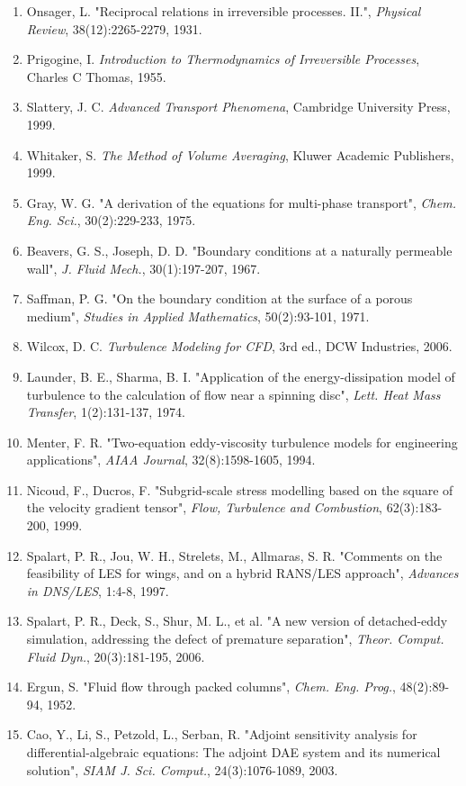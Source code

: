 \documentclass[11pt,a4paper]{article}
\begin{document}
\begin{enumerate}[leftmargin=*]
    \item Onsager, L. "Reciprocal relations in irreversible processes. II.", \textit{Physical Review}, 38(12):2265-2279, 1931.
    \item Prigogine, I. \textit{Introduction to Thermodynamics of Irreversible Processes}, Charles C Thomas, 1955.
    \item Slattery, J. C. \textit{Advanced Transport Phenomena}, Cambridge University Press, 1999.
    \item Whitaker, S. \textit{The Method of Volume Averaging}, Kluwer Academic Publishers, 1999.
    \item Gray, W. G. "A derivation of the equations for multi-phase transport", \textit{Chem. Eng. Sci.}, 30(2):229-233, 1975.
    \item Beavers, G. S., Joseph, D. D. "Boundary conditions at a naturally permeable wall", \textit{J. Fluid Mech.}, 30(1):197-207, 1967.
    \item Saffman, P. G. "On the boundary condition at the surface of a porous medium", \textit{Studies in Applied Mathematics}, 50(2):93-101, 1971.
    \item Wilcox, D. C. \textit{Turbulence Modeling for CFD}, 3rd ed., DCW Industries, 2006.
    \item Launder, B. E., Sharma, B. I. "Application of the energy-dissipation model of turbulence to the calculation of flow near a spinning disc", \textit{Lett. Heat Mass Transfer}, 1(2):131-137, 1974.
    \item Menter, F. R. "Two-equation eddy-viscosity turbulence models for engineering applications", \textit{AIAA Journal}, 32(8):1598-1605, 1994.
    \item Nicoud, F., Ducros, F. "Subgrid-scale stress modelling based on the square of the velocity gradient tensor", \textit{Flow, Turbulence and Combustion}, 62(3):183-200, 1999.
    \item Spalart, P. R., Jou, W. H., Strelets, M., Allmaras, S. R. "Comments on the feasibility of LES for wings, and on a hybrid RANS/LES approach", \textit{Advances in DNS/LES}, 1:4-8, 1997.
    \item Spalart, P. R., Deck, S., Shur, M. L., et al. "A new version of detached-eddy simulation, addressing the defect of premature separation", \textit{Theor. Comput. Fluid Dyn.}, 20(3):181-195, 2006.
    \item Ergun, S. "Fluid flow through packed columns", \textit{Chem. Eng. Prog.}, 48(2):89-94, 1952.
    \item Cao, Y., Li, S., Petzold, L., Serban, R. "Adjoint sensitivity analysis for differential-algebraic equations: The adjoint DAE system and its numerical solution", \textit{SIAM J. Sci. Comput.}, 24(3):1076-1089, 2003.

\end{enumerate}
\end{document}
